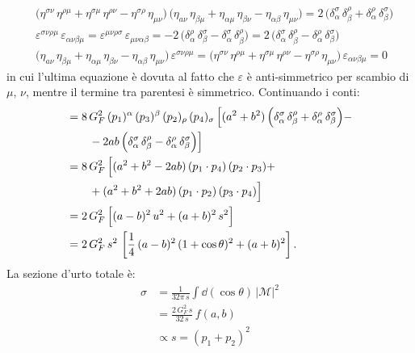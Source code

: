 \begin{align*}
    &\Big( \eta^{\sigma\nu}\, \eta^{\rho\mu} + \eta^{\sigma\mu}\, \eta^{\rho\nu} - \eta^{\sigma\rho}\, \eta_{\mu\nu} \Big)\, \Big( \eta_{a\nu}\, \eta_{\beta\mu} + \eta_{\alpha\mu}\, \eta_{\beta\nu} - \eta_{\alpha\beta}\, \eta_{\mu\nu} \Big) = 2\, \Big( \delta_\alpha^\sigma\, \delta_\beta^\rho + \delta_\alpha^\rho\, \delta_\beta^\sigma \Big) \\
    &\varepsilon^{\sigma\nu\rho\mu}\, \varepsilon_{\alpha\nu\beta\mu} = \varepsilon^{\mu\nu\rho\sigma}\, \varepsilon_{\mu\nu\alpha\beta} = -2\, \Big( \delta^\rho_\alpha\, \delta_\beta^\sigma - \delta_\alpha^\sigma\, \delta_\beta^\rho \Big) = 2\, \Big( \delta_\alpha^\sigma\, \delta_\beta^\rho - \delta^\rho_\alpha\, \delta_\beta^\sigma \Big) \\
    &\big( \eta_{a\nu}\, \eta_{\beta\mu} + \eta_{\alpha\mu}\, \eta_{\beta\nu} - \eta_{\alpha\beta}\, \eta_{\mu\nu} \big)\, \varepsilon^{\sigma\nu\rho\mu} = \big( \eta^{\sigma\nu}\, \eta^{\rho\mu} + \eta^{\sigma\mu}\, \eta^{\rho\nu} - \eta^{\sigma\rho}\, \eta_{\mu\nu} \big)\, \varepsilon_{\alpha\nu\beta\mu} = 0
\end{align*}
in cui l'ultima equazione è dovuta al fatto che $\varepsilon$ è anti-simmetrico per scambio di $\mu$, $\nu$, mentre il termine tra parentesi è simmetrico. Continuando i conti:
\begin{align}
    &= 8\, G_F^2\, (p_1)^\alpha\, (p_3)^\beta\, (p_2)_\rho\, (p_4)_\sigma\, \Big[ (a^2 + b^2)\, \Big( \delta_\alpha^\sigma\, \delta_\beta^\rho + \delta_\alpha^\rho\, \delta_\beta^\sigma \Big) - \notag \\
    &\qquad - 2ab\, \Big( \delta_\alpha^\sigma\, \delta_\beta^\rho - \delta^\rho_\alpha\, \delta_\beta^\sigma \Big) \Big] \\
    &= 8\, G_F^2\, \Big[ (a^2 + b^2 - 2ab)\, (p_1\cdot p_4)\, (p_2\cdot p_3) + \notag \\
    &\qquad + (a^2 + b^2 + 2ab)\, (p_1\cdot p_2)\, (p_3\cdot p_4) \Big] \\
    &= 2\, G_F^2\, \Big[ (a - b)^2\, u^2 + (a + b)^2\, s^2 \Big] \\
    &= 2\, G_F^2\, s^2\, \left[ \frac{1}{4}\, (a-b)^2\, (1 + \cos\theta)^2 + (a+b)^2 \right].
\end{align}
La sezione d'urto totale è:
\begin{align}
    \sigma &= \frac{1}{32\pi\, s}\int\dd(\cos\theta)\, |\mathcal{M}|^2 \\
    &= \frac{2\, G_F^2\, s}{32\, s}\, f(a,b) \\
    &\propto s = (p_1 + p_2)^2
\end{align}
